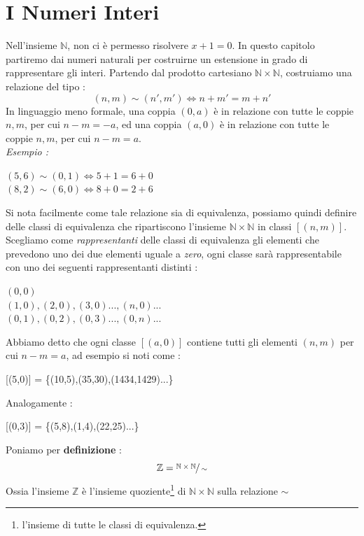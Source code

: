 \documentclass[12pt, letterpaper]{article}
\begin{document}
\section{I Numeri Interi}
Nell'insieme \(\mathbb{N}\), non ci è permesso risolvere \(x+1=0\). In questo capitolo partiremo dai numeri 
naturali per costruirne un estensione in grado di rappresentare gli interi. Partendo dal prodotto cartesiano 
\(\mathbb{N}\times\mathbb{N}\), costruiamo una relazione del tipo : 
\begin{equation}
    (n,m)\sim (n',m')\iff n+m' = m+n'
\end{equation}
In linguaggio meno formale, una coppia \((0,a)\) è in relazione con tutte le coppie \(n,m\), per cui \(n-m=-a\),
ed  una coppia \((a,0)\) è in relazione con tutte le coppie \(n,m\), per cui \(n-m=a\).\\
\textit{Esempio :}
\begin{center}
    \((5,6)\sim (0,1)\iff 5+1 = 6+0 \)\\\((8,2)\sim (6,0)\iff 8+0 = 2+6\)
\end{center}
Si nota facilmente come tale relazione sia di equivalenza, possiamo quindi definire delle classi di equivalenza
che ripartiscono l'insieme \(\mathbb{N}\times\mathbb{N}\) in classi \([(n,m)]\). Scegliamo come \textit{rappresentanti}
delle classi di equivalenza gli elementi che prevedono uno dei due elementi uguale a \textit{zero}, ogni classe sarà 
rappresentabile con uno dei seguenti rappresentanti distinti :
\begin{center}
    \((0,0)\)\hphantom{\(,(2,0),(3,0)...,(n,0)...\)}\\\((1,0),(2,0),(3,0)...,(n,0)...\)
    \\\((0,1),(0,2),(0,3)...,(0,n)...\)
\end{center}
Abbiamo detto che ogni classe \([(a,0)]\) contiene tutti gli elementi \((n,m)\) per cui \(n-m=a\), ad esempio
si noti come : 
\begin{center}
    [(5,0)] = \{(10,5),(35,30),(1434,1429)...\}
\end{center}
Analogamente : 
\begin{center}
    [(0,3)] = \{(5,8),(1,4),(22,25)...\}
\end{center}
Poniamo per \textbf{definizione} : 
\begin{equation}
     \mathbb{Z} = \displaystyle\sfrac{\mathbb{N}\times\mathbb{N}}{\sim}
\end{equation}
\newpage Ossia l'insieme \( \mathbb{Z} \) è l'insieme quoziente\footnote{l'insieme di tutte le 
classi di equivalenza.} di \(\mathbb{N}\times\mathbb{N}\) sulla relazione \(\sim\)
\end{document}
